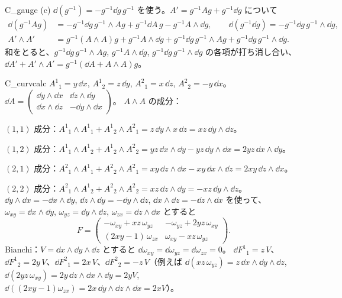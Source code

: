 \begin{soll}{C_gauge}
(c) $\dd(g^{-1})=-g^{-1}\dd g\,g^{-1}$ を使う。$A'=g^{-1}Ag+g^{-1}\dd g$ について
\begin{align*}
\dd(g^{-1}Ag)&=-g^{-1}\dd g\,g^{-1}\wedge Ag+g^{-1}\dd A\,g-g^{-1}A\wedge\dd g,\qquad\dd(g^{-1}\dd g)=-g^{-1}\dd g\,g^{-1}\wedge\dd g,\\
A'\wedge A'&=g^{-1}(A\wedge A)g+g^{-1}A\wedge\dd g+g^{-1}\dd g\,g^{-1}\wedge Ag+g^{-1}\dd g\,g^{-1}\wedge\dd g.
\end{align*}
和をとると、$g^{-1}\dd g\,g^{-1}\wedge Ag$, $g^{-1}A\wedge\dd g$, $g^{-1}\dd g\,g^{-1}\wedge\dd g$ の各項が打ち消し合い、$\dd A'+A'\wedge A'=g^{-1}(\dd A+A\wedge A)g$。
\end{soll}

\begin{soll}{C_curvcalc}
$A^1{}_1=y\,\dd x$, $A^1{}_2=z\,\dd y$, $A^2{}_1=x\,\dd z$, $A^2{}_2=-y\,\dd x$。
$\dd A=\begin{pmatrix}\dd y\wedge\dd x&\dd z\wedge\dd y\\\dd x\wedge\dd z&-\dd y\wedge\dd x\end{pmatrix}$。
$A\wedge A$ の成分：
\par\noindent$(1,1)$ 成分：$A^1{}_1\wedge A^1{}_1+A^1{}_2\wedge A^2{}_1=z\,\dd y\wedge x\,\dd z=xz\,\dd y\wedge\dd z$。
\par\noindent$(1,2)$ 成分：$A^1{}_1\wedge A^1{}_2+A^1{}_2\wedge A^2{}_2=yz\,\dd x\wedge\dd y-yz\,\dd y\wedge\dd x=2yz\,\dd x\wedge\dd y$。
\par\noindent$(2,1)$ 成分：$A^2{}_1\wedge A^1{}_1+A^2{}_2\wedge A^2{}_1=xy\,\dd z\wedge\dd x-xy\,\dd x\wedge\dd z=2xy\,\dd z\wedge\dd x$。
\par\noindent$(2,2)$ 成分：$A^2{}_1\wedge A^1{}_2+A^2{}_2\wedge A^2{}_2=xz\,\dd z\wedge\dd y=-xz\,\dd y\wedge\dd z$。
$\dd y\wedge\dd x=-\dd x\wedge\dd y$, $\dd z\wedge\dd y=-\dd y\wedge\dd z$, $\dd x\wedge\dd z=-\dd z\wedge\dd x$ を使って、$\omega_{xy}=\dd x\wedge\dd y$, $\omega_{yz}=\dd y\wedge\dd z$, $\omega_{zx}=\dd z\wedge\dd x$ とすると
\[
F=\begin{pmatrix}-\omega_{xy}+xz\,\omega_{yz}&-\omega_{yz}+2yz\,\omega_{xy}\\(2xy-1)\,\omega_{zx}&\omega_{xy}-xz\,\omega_{yz}\end{pmatrix}.
\]
Bianchi：$V=\dd x\wedge\dd y\wedge\dd z$ とすると $\dd\omega_{xy}=\dd\omega_{yz}=\dd\omega_{zx}=0$。
$\dd F^1{}_1=z\,V$、$\dd F^1{}_2=2y\,V$、$\dd F^2{}_1=2x\,V$、$\dd F^2{}_2=-z\,V$（例えば $\dd(xz\,\omega_{yz})=z\,\dd x\wedge\dd y\wedge\dd z$, $\dd(2yz\,\omega_{xy})=2y\,\dd z\wedge\dd x\wedge\dd y=2yV$, $\dd((2xy-1)\omega_{zx})=2x\,\dd y\wedge\dd z\wedge\dd x=2xV$）。

\end{soll}

